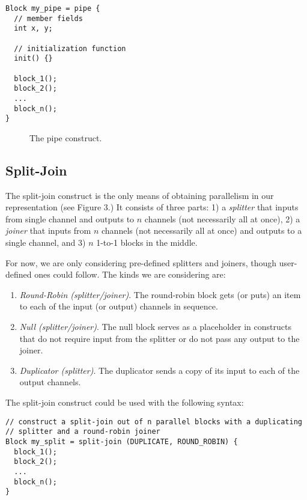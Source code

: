 \begin{verbatim}
Block my_pipe = pipe {
  // member fields
  int x, y;

  // initialization function
  init() {}

  block_1();
  block_2();
  ...
  block_n();
}
\end{verbatim}

\begin{figure}[t]
\centerline{}
\vspace{-24pt}
\caption{\protect\small The pipe construct.}
\end{figure}

\subsection{Split-Join}

The split-join construct is the only means of obtaining parallelism in
our representation (see Figure 3.)  It consists of three parts: 1) a
{\em splitter} that inputs from single channel and outputs to $n$
channels (not necessarily all at once), 2) a {\em joiner} that inputs
from $n$ channels (not necessarily all at once) and outputs to a single
channel, and 3) $n$ 1-to-1 blocks in the middle.

For now, we are only considering pre-defined splitters and joiners,
though user-defined ones could follow.  The kinds we are considering
are:

\begin{enumerate}

\item {\em Round-Robin (splitter/joiner)}.  The round-robin block gets
(or puts) an item to each of the input (or output) channels in sequence.

\item {\em Null (splitter/joiner)}.  The null block serves as a
placeholder in constructs that do not require input from the splitter or
do not pass any output to the joiner.

\item {\em Duplicator (splitter)}.  The duplicator sends a copy of its
input to each of the output channels.

\end{enumerate}

The split-join construct could be used with the following syntax:

\begin{verbatim}
// construct a split-join out of n parallel blocks with a duplicating
// splitter and a round-robin joiner
Block my_split = split-join (DUPLICATE, ROUND_ROBIN) {
  block_1();
  block_2();
  ...
  block_n();
}
\end{verbatim}

